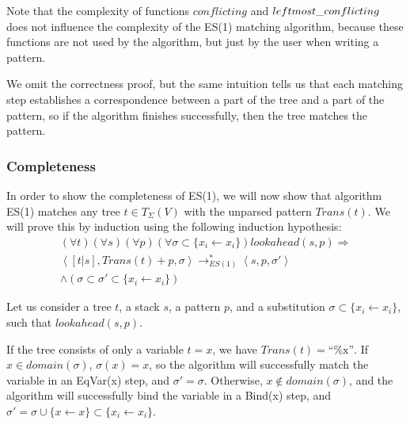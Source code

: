 \documentclass{sigplanconf}
\begin{document}
Note that the complexity of functions $conflicting$ and
$left\-most\_con\-flic\-ting$ does not influence the complexity of the ES(1)
matching algorithm, because these functions are not used by the
algorithm, but just by the user when writing a pattern.

We omit the correctness proof, but the same intuition tells us that
each matching step establishes a correspondence between a part of the
tree and a part of the pattern, so if the algorithm finishes
successfully, then the tree matches the pattern.

\subsubsection{Completeness}
In order to show the completeness of ES(1), we will now show that
algorithm ES(1) matches any tree $t \in T_\Sigma(V)$ with the unparsed
pattern $Trans(t)$. We will prove this by induction using the
following induction hypothesis:
\begin{eqnarray*}
(\forall t)(\forall s)(\forall p)(\forall \sigma \subset \{x_i \gets x_i\})
  lookahead(s, p) \Rightarrow \\
\left<[t | s], Trans(t)+p, \sigma\right> \longrightarrow_{ES(1)}^*
  \left<s, p, \sigma' \right> \\
  \land (\sigma\subset\sigma'\subset\{x_i \gets x_i\})
\end{eqnarray*}

Let us consider a tree $t$, a stack $s$, a pattern $p$, and a
substitution $\sigma \subset \{x_i \gets x_i\}$, such that
$lookahead(s, p)$.

If the tree consists of only a variable $t=x$, we have
$Trans(t)=\mbox{``\%x''}$. If $x \in domain(\sigma)$,
$\sigma(x)=x$, so the algorithm will successfully match the variable in
an EqVar(x) step, and $\sigma'=\sigma$. Otherwise, $x \not\in
domain(\sigma)$, and the algorithm will successfully bind the variable in
a Bind(x) step, and $\sigma'=\sigma\cup\{x \gets x\} \subset \{x_i
\gets x_i\}$.
\end{document}
